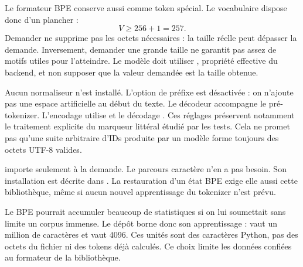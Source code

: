 Le formateur BPE conserve aussi  comme token spécial. Le vocabulaire
dispose donc d'un plancher :
\[
    V\geq 256+1=257.
\]
Demander  ne supprime pas les octets nécessaires :
la taille réelle peut dépasser la demande. Inversement, demander une grande
taille ne garantit pas assez de motifs utiles pour l'atteindre. Le modèle
doit utiliser , propriété effective du backend,
et non supposer que la valeur demandée est la taille obtenue.

Aucun normaliseur n'est installé. L'option de préfixe est désactivée :
on n'ajoute pas une espace artificielle au début du texte. Le décodeur
 accompagne le pré-tokenizer. L'encodage utilise
 et le décodage
. Ces réglages préservent notamment
le traitement explicite du marqueur littéral étudié par les tests.
Cela ne promet pas qu'une suite arbitraire d'IDs produite par un modèle
forme toujours des octets UTF-8 valides.

 importe  seulement à la demande.
Le parcours caractère n'en a pas besoin. Son installation est décrite dans
.
La restauration d'un état BPE exige elle aussi cette bibliothèque, même
si aucun nouvel apprentissage du tokenizer n'est prévu.


Le BPE pourrait accumuler beaucoup de statistiques si on lui soumettait
sans limite un corpus immense. Le dépôt borne donc son apprentissage :
 vaut un million de caractères et
 vaut 4096.
Ces unités sont des caractères Python, pas des octets du fichier ni des tokens
déjà calculés. Ce choix limite les données confiées au formateur de la bibliothèque.


